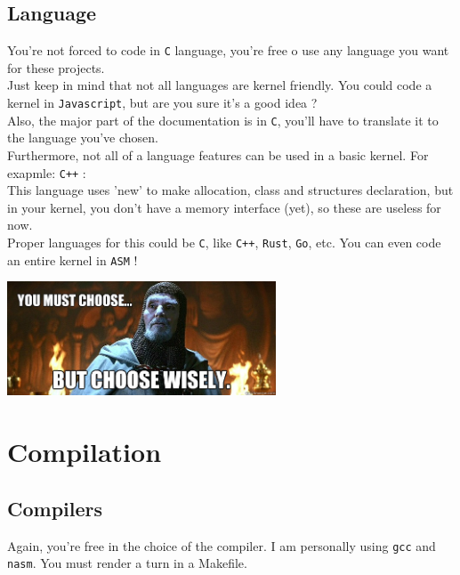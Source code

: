\documentclass{42-en}
\begin{document}
		\subsection{Language}
			You're not forced to code in \texttt C language, you're free
            o use any language you want for these projects.\\

			Just keep in mind that not all languages are kernel
            friendly. You could code a kernel in \texttt{Javascript},
            but are you sure it's a good idea ?\\

            Also, the major part of the documentation is in
            \texttt{C}, you'll have to translate it to the language
            you've chosen.\\

			Furthermore, not all of a language features can be used in a
			basic kernel. For exapmle: \texttt{C++} :\\
			This language uses 'new' to make allocation, class and
            structures declaration, but in your kernel, you don't have
            a memory interface (yet), so these are useless for now.\\

			Proper languages for this could be \texttt{C},
			like \texttt{C++}, \texttt{Rust}, \texttt{Go}, etc.
			You can even code an entire kernel in \texttt{ASM} !\\
			\begin{center}
			  \includegraphics[width=8cm]{choose.jpg}
			\end{center}

\newpage


	\section{Compilation}
		\subsection{Compilers}
			Again, you're free in the choice of the compiler. I am
            personally using \texttt{gcc} and \texttt{nasm}. You must
            render a turn in a Makefile.
\end{document}

